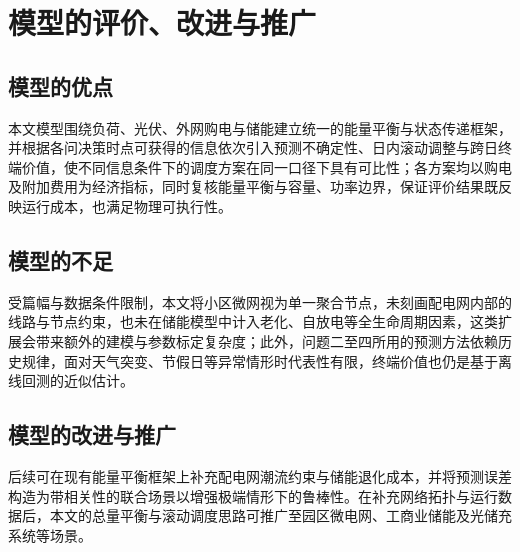 \section{模型的评价、改进与推广}

\subsection{模型的优点}
本文模型围绕负荷、光伏、外网购电与储能建立统一的能量平衡与状态传递框架，并根据各问决策时点可获得的信息依次引入预测不确定性、日内滚动调整与跨日终端价值，使不同信息条件下的调度方案在同一口径下具有可比性；各方案均以购电及附加费用为经济指标，同时复核能量平衡与容量、功率边界，保证评价结果既反映运行成本，也满足物理可执行性。

\subsection{模型的不足}
受篇幅与数据条件限制，本文将小区微网视为单一聚合节点，未刻画配电网内部的线路与节点约束，也未在储能模型中计入老化、自放电等全生命周期因素，这类扩展会带来额外的建模与参数标定复杂度；此外，问题二至四所用的预测方法依赖历史规律，面对天气突变、节假日等异常情形时代表性有限，终端价值也仍是基于离线回测的近似估计。

\subsection{模型的改进与推广}
后续可在现有能量平衡框架上补充配电网潮流约束与储能退化成本，并将预测误差构造为带相关性的联合场景以增强极端情形下的鲁棒性。在补充网络拓扑与运行数据后，本文的总量平衡与滚动调度思路可推广至园区微电网、工商业储能及光储充系统等场景。
